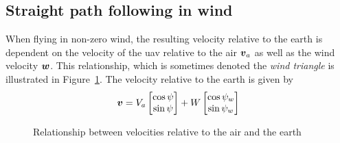 \subsection{Straight path following in wind}\label{sec:straight_path_wind}
When flying in non-zero wind, the resulting velocity relative to the earth is dependent on the velocity 
of the \ac{uav} relative to the air $\boldsymbol{v}_a$ as well as the wind velocity $\boldsymbol{w}$.
This relationship, which is sometimes denoted the \textit{wind triangle} is illustrated in Figure~\ref{fig:wind_triangle}. The 
velocity relative to the earth is given by 
\begin{equation}\label{eq:inertial_vel}
    \boldsymbol{v} = V_a\begin{bmatrix}
        \cos\psi \\
        \sin\psi
    \end{bmatrix}
    + W\begin{bmatrix}
        \cos\psi_w\\
        \sin\psi_w
    \end{bmatrix}
\end{equation}

\begin{figure}
    \begin{center}
    \end{center}
    \caption{Relationship between velocities relative to the air and the earth}
    \label{fig:wind_triangle}    
\end{figure}

